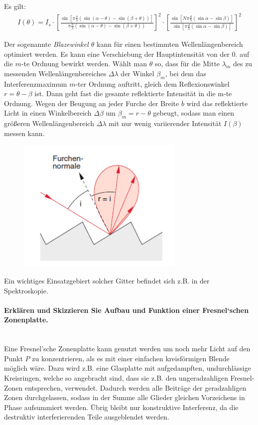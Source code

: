 \documentclass[a4paper, 11pt, ngerman, parskip=half-]{scrartcl}
\newcommand{\myparagraph}[1]{\paragraph{#1}\mbox{}\\}
\begin{document}
Es gilt:
\begin{align*}
    I(\theta) = I_s \cdot%
    \left[ \frac{\sin[\pi \frac{b}{\lambda} (\sin(\alpha - \theta) - \sin(\beta + \theta))]}{\pi \frac{b}{\lambda} (\sin(\alpha - \theta) - \sin(\beta + \theta))} \right]^2 \cdot%
    \left[ \frac{\sin[N \pi \frac{d}{\lambda} (\sin \alpha - \sin \beta)]}{\sin[\pi \frac{d}{\lambda} (\sin \alpha - \sin \beta)]} \right]^2
\end{align*}

Der sogenannte \textit{Blazewinkel $\theta$} kann für einen bestimmten Wellenlängenbereich optimiert werden. Es kann eine Verschiebung der Hauptintensität
von der 0. auf die $m$-te Ordnung bewirkt werden. Wählt man $\theta$ so, dass für die Mitte $\lambda_m$ des zu messenden Wellenlängenbereiches $\Delta \lambda$
der Winkel $\beta_m$, bei dem das Interferenzmaximum $m$-ter Ordnung auftritt, gleich dem Reflexionswinkel $r = \theta -\beta$ ist. Dann geht fast die gesamte
reflektierte Intensität in die m-te Ordnung. Wegen der Beugung an jeder Furche der Breite $b$ wird das reflektierte Licht in einen Winkelbereich $\Delta \beta$
um $\beta_m = r - \theta$ gebeugt, sodass man einen größeren Wellenlängenbereich $\Delta \lambda$ mit nur wenig variierender Intensität $I(\beta)$ messen kann.

\begin{figure}[H]
    \centering
    \includegraphics[width=8cm]{image/19/4.2}
\end{figure}

Ein wichtiges Einsatzgebiert solcher Gitter befindet sich z.B. in der Spektroskopie.

\myparagraph{Erklären und Skizzieren Sie Aufbau und Funktion einer Fresnel‘schen Zonenplatte.}

Eine Fresnel'sche Zonenplatte kann genutzt werden um noch mehr Licht auf den Punkt $P$ zu konzentrieren,
als es mit einer einfachen kreisförmigen Blende möglich wäre. Dazu wird z.B. eine Glasplatte mit aufgedampften,
undurchlässige Kreisringen, welche so angebracht sind, dass sie z.B. den ungeradzahligen Fresnel-Zonen entsprechen,
verwendet. Dadurch werden alle Beiträge der geradzahligen Zonen durchgelassen, sodass in der Summe alle Glieder
gleichen Vorzeichens in Phase aufsummiert werden. Übrig bleibt nur konstruktive Interferenz, da die destruktiv
interferierenden Teile ausgeblendet werden.
\end{document}
